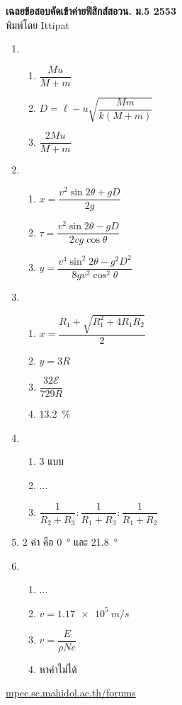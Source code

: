 \documentclass[a4paper,12pt]{article}
\begin{document}
\thispagestyle{empty}
\begin{center}
	{\huge \textbf{เฉลยข้อสอบคัดเข้าค่ายฟิสิกส์สอวน. ม.\textenglish{5} 2553}}\\
	พิมพ์โดย Ittipat\\
\end{center}
\begin{enumerate}
	\item \
	\begin{enumerate}
		\item \(\dfrac{Mu}{M+m}\)
		\item \(D=\ell-u\sqrt{\dfrac{Mm}{k(M+m)}}\)
		\item \(\dfrac{2Mu}{M+m}\)          
	\end{enumerate}
	\item \
	\begin{enumerate}
		\item \(x = \dfrac{v^2\sin2\theta + gD}{2g}\)
		\item \(\tau =\dfrac{v^2\sin2\theta - gD}{2vg\cos\theta}\)
		\item \(y = \dfrac{v^4\sin^2 2\theta - g^2D^2}{8gv^2\cos^2 \theta}\)
	\end{enumerate}
	\item \
	\begin{enumerate}
		\item \(x=\dfrac{R_1+\sqrt{R_1^2+4R_1R_2}}{2}\)
		\item \(y=3R\)
		\item \(\dfrac{32\mathcal{E}}{729R}\)
		\item \SI{13.2}{\%}
	\end{enumerate}
	\item \
	\begin{enumerate}
		\item 3 แบบ
		\item ...
		\item \(\dfrac{1}{R_2+R_3}:\dfrac{1}{R_1+R_3}:\dfrac{1}{R_1+R_2}\)
	\end{enumerate}
	\item 2 ค่า คือ \SI{0}{\degree} และ \SI{21.8}{\degree}
	\item \
	\begin{enumerate}
		\item ...
		\item \(v=\SI{1.17e5}{m/s}\)
		\item \(v = \dfrac{E}{\rho Ne}\)
		\item หาค่าไม่ได้
	\end{enumerate}
\end{enumerate}
\vfill	
\begin{center}
	\href{http://mpec.sc.mahidol.ac.th/forums/}{mpec.sc.mahidol.ac.th/forums}
\end{center}
\end{document}

